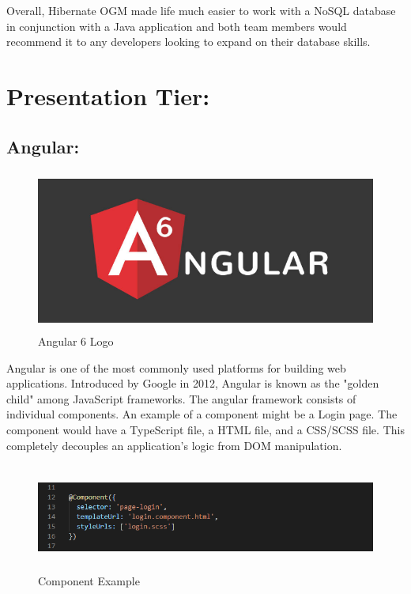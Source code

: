 \bigskip

Overall, Hibernate OGM made life much easier to work with a NoSQL database in conjunction with a Java application and both team members would recommend it to any developers looking to expand on their database skills.


\section{Presentation Tier:}
\label{sec:TechnologyReviewPresentationTier}
\subsection{Angular:}
\label{sec:TechnologyReviewAngular}

\begin{figure}[H]
    \centering
    \includegraphics[width=\textwidth, height=150pt]{img/Angular6Logo.PNG}
    \caption{Angular 6 Logo}
    \label{fig:my_label}
\end{figure}

\bigskip

Angular is one of the most commonly used platforms for building web applications. Introduced by Google in 2012, Angular is known as the "golden child" among JavaScript frameworks. The angular framework consists of individual components. An example of a component might be a Login page. The component would have a TypeScript file, a HTML file, and a CSS/SCSS file. This completely decouples an application's logic from DOM manipulation.

\bigskip

\begin{figure}[H]
    \centering
    \includegraphics[width=\textwidth, height=100pt]{img/LoginComponent.PNG}
    \caption{Component Example}
    \label{fig:my_label}
\end{figure}


